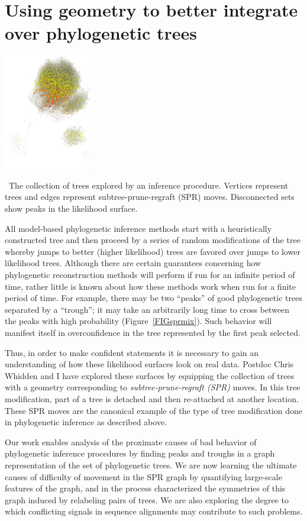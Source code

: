 \documentclass[hyper]{tufte-handout}
\newcommand{\etal}{\textit{et. al.}}
\newcommand{\scite}[3]{\sidenote{\href{#3}{#1 \etal\ #2.}}}
\begin{document}
\section{Using geometry to better integrate over phylogenetic trees}
\begin{marginfigure}%
  \includegraphics[width=1.5in]{ds6_small.png}
  \caption{\
    The collection of trees explored by an inference procedure.
    Vertices represent trees and edges represent subtree-prune-regraft (SPR) moves.
    Disconnected sets show peaks in the likelihood surface.
    }
  \label{FIGsprmix}
\end{marginfigure}
All model-based phylogenetic inference methods start with a heuristically constructed tree and then proceed by a series of random modifications of the tree whereby jumps to better (higher likelihood) trees are favored over jumps to lower likelihood trees.
Although there are certain guarantees concerning how phylogenetic reconstruction methods will perform if run for an infinite period of time, rather little is known about how these methods work when run for a finite period of time.
For example, there may be two ``peaks'' of good phylogenetic trees separated by a ``trough''; it may take an arbitrarily long time to cross between the peaks with high probability (Figure~\ref{FIGsprmix}).
Such behavior will manifest itself in overconfidence in the tree represented by the first peak selected.

Thus, in order to make confident statements it is necessary to gain an understanding of how these likelihood surfaces look on real data.
Postdoc Chris Whidden and I have explored these surfaces by equipping the collection of trees with a geometry corresponding to \textit{subtree-prune-regraft (SPR)} moves.
In this tree modification, part of a tree is detached and then re-attached at another location.
These SPR moves are the canonical example of the type of tree modification done in phylogenetic inference as described above.

Our work enables analysis of the proximate causes of bad behavior of phylogenetic inference procedures by finding peaks and troughs in a graph representation of the set of phylogenetic trees.\scite{Whidden}{2014}{http://arxiv.org/abs/1405.2120}
We are now learning the ultimate causes of difficulty of movement in the SPR graph by quantifying large-scale features of the graph, and in the process characterized the symmetries of this graph induced by relabeling pairs of trees.
We are also exploring the degree to which conflicting signals in sequence alignments may contribute to such problems.
\end{document}
